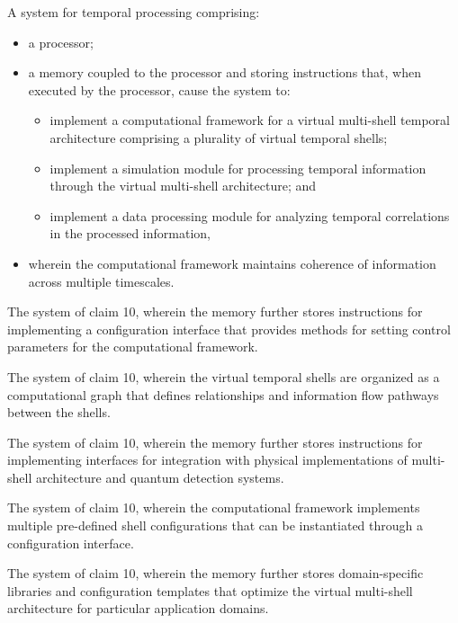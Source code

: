 \documentclass[12pt,letterpaper]{article}
\begin{document}
\begin{patentclaims}
    \item A system for temporal processing comprising:
    \begin{itemize}[leftmargin=2em]
        \item a processor;
        \item a memory coupled to the processor and storing instructions that, when executed by the processor, cause the system to:
        \begin{itemize}
            \item implement a computational framework for a virtual multi-shell temporal architecture comprising a plurality of virtual temporal shells;
            \item implement a simulation module for processing temporal information through the virtual multi-shell architecture; and
            \item implement a data processing module for analyzing temporal correlations in the processed information,
        \end{itemize}
        \item wherein the computational framework maintains coherence of information across multiple timescales.
    \end{itemize}
    
    \item The system of claim 10, wherein the memory further stores instructions for implementing a configuration interface that provides methods for setting control parameters for the computational framework.
    
    \item The system of claim 10, wherein the virtual temporal shells are organized as a computational graph that defines relationships and information flow pathways between the shells.
    
    \item The system of claim 10, wherein the memory further stores instructions for implementing interfaces for integration with physical implementations of multi-shell architecture and quantum detection systems.
    
    \item The system of claim 10, wherein the computational framework implements multiple pre-defined shell configurations that can be instantiated through a configuration interface.
    
    \item The system of claim 10, wherein the memory further stores domain-specific libraries and configuration templates that optimize the virtual multi-shell architecture for particular application domains.
    

\end{patentclaims}
\end{document}
